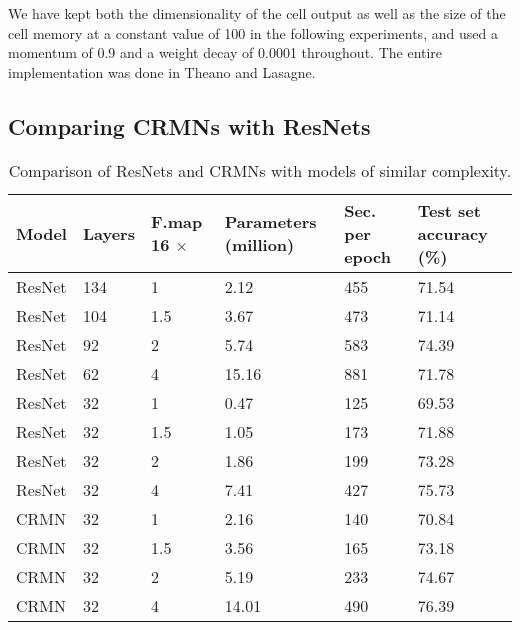 \documentclass{article}
\begin{document}
We have kept both the dimensionality of the cell output as well as the size of the cell memory at a constant value of 100 in the following experiments, and used a momentum of 0.9 and a weight decay of 0.0001 throughout. The entire implementation was done in Theano \cite{2016arXiv160502688short} and Lasagne.

\subsection{Comparing CRMNs with ResNets}

\begin{table}[htb!]
\centering
\begin{tabular}{ p{1.5cm}  p{.9cm} p{.7cm}  p{1.7cm}  p{1.5cm}  p{1.9cm}  }
 \hline
Model & Layers & F.map 16 $\times$ & Parameters \newline (million) &  Sec. per \newline epoch  & Test set \newline accuracy (\%)   \\ \hline
ResNet	&  134 &	1	& 2.12  &	455  &	71.54 \\
ResNet	&  104 &	1.5	& 3.67  &	473  &	71.14 \\
ResNet	&  92  &	2	& 5.74  &	583  &	74.39 \\
ResNet	&  62  &	4	& 15.16 &	881  &	71.78 \\ \hline
ResNet  &  32  &  1	    & 0.47 &	125  & 69.53 \\
ResNet  &  32  &  1.5   & 1.05 &	173  & 71.88 \\
ResNet  &  32  &  2	    & 1.86 &	199  & 73.28 \\
ResNet  &  32  &  4	    & 7.41 &	427  & 75.73 \\ \hline
CRMN    &  32  &	1	& 2.16  &	140 &   70.84 \\
CRMN    &  32  &	1.5	& 3.56  &	165 &	73.18 \\
CRMN    &  32  &	2	& 5.19  &	233 &   74.67 \\
CRMN    &  32  &	4	& 14.01 &	490 &	76.39 \\ \hline %
\end{tabular}
\caption{Comparison of ResNets and CRMNs with models of similar complexity.}
\label{explore}
\end{table}
\end{document}
